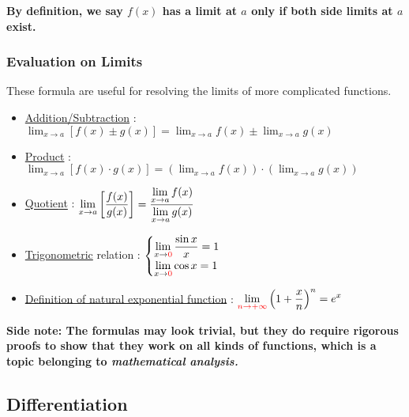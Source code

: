 \documentclass[class=article, crop=false, 12pt]{standalone}
\begin{document}
\bf{By definition}, we say $f(x)$ has a limit at $a$ only if \bf{both side limits at $a$ exist}.


\subsubsection{Evaluation on Limits}

These formula are useful for resolving the limits of more complicated functions.

\begin{itemize}
    \item \ul{Addition/Subtraction} : $\displaystyle \lim_{x\to a} [f(x) \pm g(x)] = \lim_{x\to a}f(x) \pm \lim_{x\to a} g(x)$
    
    \item \ul{Product} : $\displaystyle \lim_{x\to a} [f(x) \cdot g(x)] = (\lim_{x\to a} f(x))\cdot (\lim_{x\to a} g(x))$
    
    \item \ul{Quotient} : $\displaystyle \lim_{x\to a} \qty[\frac{f(x)}{g(x)}] = \frac{\displaystyle\lim_{x\to a}f(x)}{\displaystyle\lim_{x\to a} g(x)}$ \quad {}
    
    \item \ul{Trigonometric} relation :
    $
        \begin{cases}
            \displaystyle \lim_{x\to {\color{red}{0}}} \frac{\sin{x}}{x} = 1 \\
            \displaystyle \lim_{x\to {\color{red}{0}}} \cos{x} = 1
        \end{cases}
    $
    
    \item \ul{Definition of natural exponential function} : $\displaystyle \lim_{\color{red}{n\to +\infty}} \qty(1+\frac{x}{n})^n = e^x$
\end{itemize}

\bf{Side note:} The formulas may look trivial, 
but they do require rigorous proofs to show that they work on all kinds of functions, 
which is a topic belonging to \it{mathematical analysis}.


\subsection{Differentiation}
\end{document}
